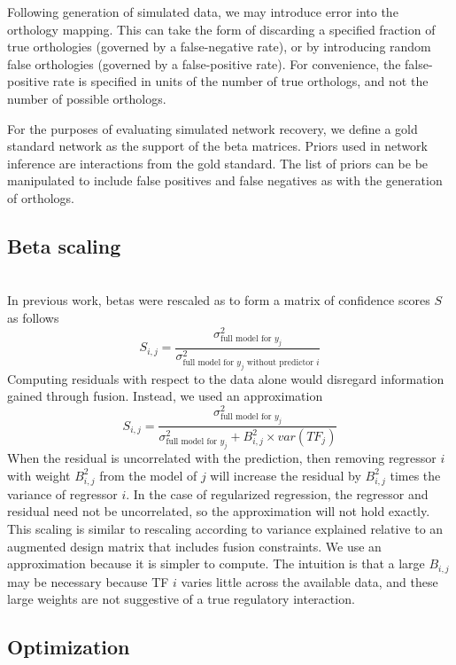 \documentclass[11pt]{article}
\begin{document}
Following generation of simulated data, we may introduce error into the orthology mapping. This can take the form of discarding a specified fraction of true orthologies (governed by a false-negative rate), or by introducing random false orthologies (governed by a false-positive rate). For convenience, the false-positive rate is specified in units of the number of true orthologs, and not the number of possible orthologs. 

For the purposes of evaluating simulated network recovery, we define a gold standard network as the support of the beta matrices. Priors used in network inference are interactions from the gold standard. The list of priors can be be manipulated to include false positives and false negatives as with the generation of orthologs. 

\subsection{Beta scaling}
\\
In previous work, betas were rescaled as to form a matrix of confidence scores $S$ as follows
\begin{equation}
S_{i,j} = \frac{\sigma^2_{\text{full model for }y_j}}{\sigma^2_{\text{full model for }y_j \text{ without predictor }i}}
\end{equation}
Computing residuals with respect to the data alone would disregard information gained through fusion. Instead, we used an approximation
\begin{equation}
S_{i,j} = \frac{\sigma^2_{\text{full model for }y_j}}{\sigma^2_{\text{full model for }y_j} + B_{i,j}^2 \times var(TF_j)}
\end{equation}
When the residual is uncorrelated with the prediction, then removing regressor $i$ with weight $B_{i,j}^2$ from the model of $j$ will increase the residual by $B_{i,j}^2$ times the variance of regressor $i$. In the case of regularized regression, the regressor and residual need not be uncorrelated, so the approximation will not hold exactly. This scaling is similar to rescaling according to variance explained relative to an augmented design matrix that includes fusion constraints. We use an approximation because it is simpler to compute. The intuition is that a large $B_{i,j}$ may be necessary because TF $i$ varies little across the available data, and these large weights are not suggestive of a true regulatory interaction.

\subsection{Optimization}
\end{document}
